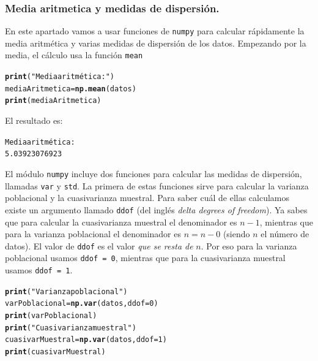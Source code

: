 \documentclass[10pt,a4paper]{article}\usepackage[]{graphicx}\usepackage[]{color}
\makeatletter
\newcommand{\hlnum}[1]{\textcolor[rgb]{0.686,0.059,0.569}{#1}}%
\newcommand{\hlstr}[1]{\textcolor[rgb]{0.192,0.494,0.8}{#1}}%
\newcommand{\hlstd}[1]{\textcolor[rgb]{0.345,0.345,0.345}{#1}}%
\newcommand{\hlkwb}[1]{\textcolor[rgb]{0.69,0.353,0.396}{#1}}%
\newcommand{\hlkwc}[1]{\textcolor[rgb]{0.333,0.667,0.333}{#1}}%
\newcommand{\hlkwd}[1]{\textcolor[rgb]{0.737,0.353,0.396}{\textbf{#1}}}%
\newenvironment{kframe}{%
 \def\at@end@of@kframe{}%
 \ifinner\ifhmode%
  \def\at@end@of@kframe{\end{minipage}}%
  \begin{minipage}{\columnwidth}%
 \fi\fi%
 \def\FrameCommand##1{\hskip\@totalleftmargin \hskip-\fboxsep
 \colorbox{shadecolor}{##1}\hskip-\fboxsep
     \hskip-\linewidth \hskip-\@totalleftmargin \hskip\columnwidth}%
 \MakeFramed {\advance\hsize-\width
   \@totalleftmargin\z@ \linewidth\hsize
   \@setminipage}}%
 {\par\unskip\endMakeFramed%
 \at@end@of@kframe}
\newenvironment{knitrout}{}{} %
\makeatother
\begin{document}
\subsubsection*{Media aritmetica y medidas de dispersión.}
\label{tut02:subsubsec:mediaAritmeticaDispersion}



En este apartado vamos a usar funciones de {\tt numpy} para calcular rápidamente la media aritmética y varias medidas de dispersión de los datos. Empezando por la media, el cálculo usa la función {\tt mean}
\begin{knitrout}
\color{fgcolor}\begin{kframe}
\begin{alltt}
\hlkwd{print}\hlstd{(}\hlstr{"Media aritmética:"}\hlstd{)}
\hlstd{mediaAritmetica} \hlkwb{=} \hlkwd{np.mean}\hlstd{(datos)}
\hlkwd{print}\hlstd{(mediaAritmetica)}
\end{alltt}
\end{kframe}
\end{knitrout}
El resultado es:
\begin{knitrout}
\color{fgcolor}\begin{kframe}
\begin{alltt}
Media aritmética:
5.03923076923
\end{alltt}
\end{kframe}
\end{knitrout}
El módulo {\tt numpy} incluye dos funciones para calcular las medidas de dispersión, llamadas {\tt var} y {\tt std}. La primera de estas funciones sirve para calcular la varianza poblacional y la cuasivarianza muestral. Para saber cuál de ellas calculamos existe un argumento llamado {\tt ddof} (del inglés {\em delta degrees of freedom}). Ya sabes que para calcular la cuasivarianza muestral el denominador es $n - 1$, mientras que para la varianza poblacional el denominador es $n = n - 0$ (siendo $n$ el número de datos). El valor de {\tt ddof} es el valor {\em que se resta de} $n$. Por eso para la varianza poblacional usamos {\tt ddof = 0}, mientras que para la cuasivarianza muestral usamos {\tt ddof = 1}.
\begin{knitrout}
\color{fgcolor}\begin{kframe}
\begin{alltt}
\hlkwd{print}\hlstd{(}\hlstr{"Varianza poblacional"}\hlstd{)}
\hlstd{varPoblacional} \hlkwb{=} \hlkwd{np.var}\hlstd{(datos,} \hlkwc{ddof}\hlstd{=}\hlnum{0}\hlstd{)}
\hlkwd{print}\hlstd{(varPoblacional)}
\hlkwd{print}\hlstd{(}\hlstr{"Cuasivarianza muestral"}\hlstd{)}
\hlstd{cuasivarMuestral} \hlkwb{=} \hlkwd{np.var}\hlstd{(datos,} \hlkwc{ddof}\hlstd{=}\hlnum{1}\hlstd{)}
\hlkwd{print}\hlstd{(cuasivarMuestral)}
\end{alltt}
\end{kframe}
\end{knitrout}
\end{document}

